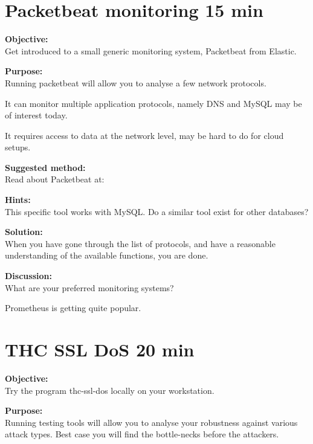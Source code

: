\documentclass[a4paper,11pt,notitlepage]{report}
\begin{document}




\chapter{Packetbeat monitoring 15 min}
\label{ex:packetbeat}


{\bf Objective:}\\
Get introduced to a small generic monitoring system, Packetbeat from Elastic.


{\bf Purpose:}\\
Running packetbeat will allow you to analyse a few network protocols.

It can monitor multiple application protocols, namely DNS and MySQL may be of interest today.

It requires access to data at the network level, may be hard to do for cloud setups.

{\bf Suggested method:}\\
Read about Packetbeat at:\\

{\bf Hints:}\\
This specific tool works with MySQL. Do a similar tool exist for other databases?


{\bf Solution:}\\
When you have gone through the list of protocols, and have a reasonable understanding of the available functions, you are done.

{\bf Discussion:}\\
What are your preferred monitoring systems?

Prometheus is getting quite popular.



\chapter{THC SSL DoS 20 min}
\label{ex:thc-ssl-dos}

{\bf Objective:}\\
Try the program thc-ssl-dos locally on your workstation.


{\bf Purpose:}\\
Running testing tools will allow you to analyse your robustness against various attack types. Best case you will find the bottle-necks before the attackers.
\end{document}
